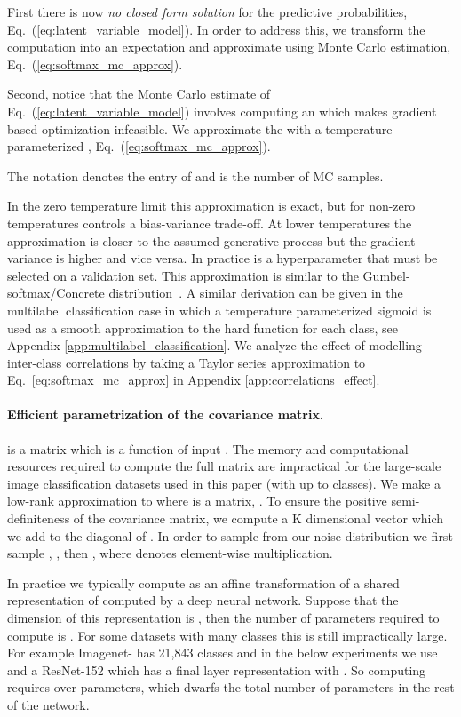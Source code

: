 \documentclass[final]{cvpr}
\begin{document}
First there is now \textit{no closed form solution} for the predictive probabilities, Eq.\ (\ref{eq:latent_variable_model}). In order to address this, we transform the computation into an expectation and approximate using Monte Carlo estimation, Eq.\ (\ref{eq:softmax_mc_approx}).

Second, notice that the Monte Carlo estimate of Eq.\ (\ref{eq:latent_variable_model}) involves computing an  which makes gradient based optimization infeasible. We approximate the  with a temperature parameterized , Eq.\ (\ref{eq:softmax_mc_approx}). 

The notation  denotes the  entry of  and  is the number of MC samples.

In the zero temperature limit this approximation is exact, but for non-zero temperatures  controls a bias-variance trade-off. At lower temperatures the approximation is closer to the assumed generative process but the gradient variance is higher and vice versa. In practice  is a hyperparameter that must be selected on a validation set. This approximation is similar to the Gumbel-softmax/Concrete distribution~\cite{gumbelsoftmax2017,concrete2017}. 
A similar derivation can be given in the multilabel classification case in which a temperature parameterized sigmoid is used as a smooth approximation to the hard  function for each class, see Appendix \ref{app:multilabel_classification}. We analyze the effect of modelling inter-class correlations by taking a Taylor series approximation to Eq.~\ref{eq:softmax_mc_approx} in Appendix \ref{app:correlations_effect}.

\paragraph{Efficient parametrization of the covariance matrix.}
 is a  matrix which is a function of input . The memory and computational resources required to compute the full  matrix are impractical for the large-scale image classification datasets used in this paper (with  up to  classes). We make a low-rank approximation to  where  is a  matrix, . To ensure the positive semi-definiteness of the covariance matrix, we compute a K dimensional vector  which we add to the diagonal of . In order to sample from our noise distribution we first sample ,
, then , where  denotes element-wise multiplication.

In practice we typically compute  as an affine transformation of a shared representation of  computed by a deep neural network. Suppose that the dimension of this representation is , then the number of parameters required to compute  is . For some datasets with many classes this is still impractically large. For example Imagenet- has 21,843 classes and in the below experiments we use  and a ResNet-152 which has a final layer representation with . So computing  requires over  parameters, which dwarfs the total number of parameters in the rest of the network.
\end{document}
